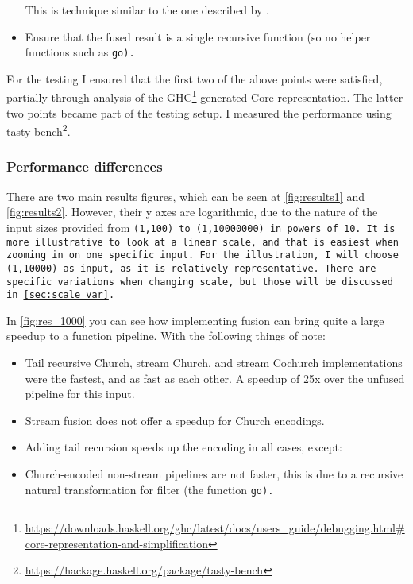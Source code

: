 \begin{itemize}[noitemsep]
This is technique similar to the one described by \cite{Breitner2018}.
\item Ensure that the fused result is a single recursive function (so no helper functions such as \tt{go}).

\end{itemize}

For the testing I ensured that the first two of the above points were satisfied, partially through analysis of the GHC\footnote{\url{https://downloads.haskell.org/ghc/latest/docs/users_guide/debugging.html\#core-representation-and-simplification}} generated Core representation.
The latter two points became part of the testing setup.
I measured the performance using tasty-bench\footnote{\url{https://hackage.haskell.org/package/tasty-bench}}.

\subsubsection{Performance differences}
There are two main results figures, which can be seen at \autoref{fig:results1} and \autoref{fig:results2}.
However, their y axes are logarithmic, due to the nature of the input sizes provided from \tt{(1,100)} to \tt{(1,10000000)} in powers of 10.
It is more illustrative to look at a linear scale, and that is easiest when zooming in on one specific input.
For the illustration, I will choose \tt{(1,10000)} as input, as it is relatively representative.
There are specific variations when changing scale, but those will be discussed in \autoref{sec:scale_var}.

In \autoref{fig:res_1000} you can see how implementing fusion can bring quite a large speedup to a function pipeline.
With the following things of note:
\begin{itemize}[noitemsep]
    \item Tail recursive Church, stream Church, and stream Cochurch implementations were the fastest, and as fast as each other. A speedup of 25x over the unfused pipeline for this input.
    \item Stream fusion does not offer a speedup for Church encodings.
    \item Adding tail recursion speeds up the encoding in all cases, except:
    \item Church-encoded non-stream pipelines are not faster, this is due to a recursive natural transformation for filter (the function \tt{go}).
\end{itemize}

